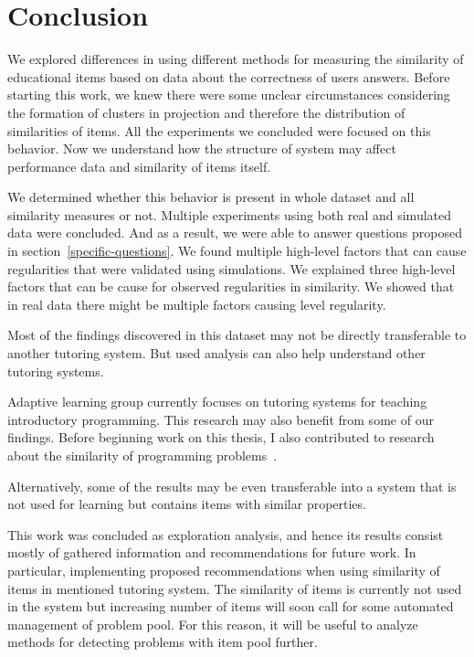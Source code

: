 \documentclass[
  print, %
  table,   %
  nolof,     %
  nolot,     %
  nocover,
  color,
  final,
]{fithesis3}
\begin{document}
\chapter{Conclusion}


We explored differences in using different methods for measuring the similarity of educational items based on data about the correctness of users answers. Before starting this work, we knew there were some unclear circumstances considering the formation of clusters in projection and therefore the distribution of similarities of items. All the experiments we concluded were focused on this behavior. Now we understand how the structure of system may affect performance data and similarity of items itself.

We determined whether this behavior is present in whole dataset and all similarity measures or not. Multiple experiments using both real and simulated data were concluded. And as a result, we were able to answer questions proposed in section~\ref{specific-questions}. We found multiple high-level factors that can cause regularities that were validated using simulations. We explained three high-level factors that can be cause for observed regularities in similarity. We showed that in real data there might be multiple factors causing level regularity.

Most of the findings discovered in this dataset may not be directly transferable to another tutoring system. But used analysis can also help understand other tutoring systems.


Adaptive learning group currently focuses on tutoring systems for teaching introductory programming. This research may also benefit from some of our findings. Before beginning work on this thesis, I also contributed to research about the similarity of programming problems~\cite{pelanek2018programming}.

Alternatively, some of the results may be even transferable into a system that is not used for learning but contains items with similar properties.


This work was concluded as exploration analysis, and hence its results consist mostly of gathered information and recommendations for future work. In particular, implementing proposed recommendations when using similarity of items in mentioned tutoring system. The similarity of items is currently not used in the system \umimeCesky{} but increasing number of items will soon call for some automated management of problem pool. For this reason, it will be useful to analyze methods for detecting problems with item pool further.
\end{document}
